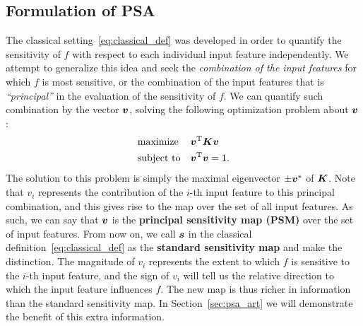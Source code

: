 \subsection{Formulation of PSA}
%
The classical setting~\eqref{eq:classical_def} was developed
in order to quantify the sensitivity of $f$ with respect
to each individual input feature independently.
%
We attempt to generalize this idea and seek the \textit{combination
of the input features} for which $f$ is most sensitive, or the combination of the input features that is
\textit{``principal''} in the evaluation of the sensitivity of $f$.
%
We can quantify such combination by the vector $\mbox{\boldmath $v$}$, solving the following
optimization problem about $\mbox{\boldmath $v$}$:
%
\begin{align}
  \begin{split}
\begin{aligned}
& \text{maximize}
& & \mbox{\boldmath $v$}^{\mathrm{T}} \mbox{\boldmath $K$} \mbox{\boldmath $v$} \\
& \text{subject to}
& & \mbox{\boldmath $v$}^{\mathrm{T}}\mbox{\boldmath $v$} = 1.
\end{aligned}
 \end{split} \label{def:psm}
\end{align}
%
The solution to this problem is simply the maximal eigenvector
$\pm\mbox{\boldmath $v$}^{*}$ of $\mbox{\boldmath $K$}$.
%
Note that $v_i$ represents the contribution of the $i$-th input feature to this principal
combination, and this gives rise to the map over the set of all input features.
As such, we can say that $\mbox{\boldmath $v$}$ is the \textbf{principal sensitivity map
(PSM)} over the set of input features.
%
From now on, we call $\mbox{\boldmath $s$}$ in the classical definition~\eqref{eq:classical_def} as the \textbf{standard sensitivity map} and
make the distinction.
%
The magnitude of $v_i$ represents the extent
to which $f$ is sensitive to the $i$-th input feature,
and the sign of $v_i$ will tell us the relative direction
to which the input feature influences $f$.
%
The new map is thus richer in information than the standard
sensitivity map.
%
In Section~\ref{sec:psa_art} we will demonstrate the benefit of this extra
information.

